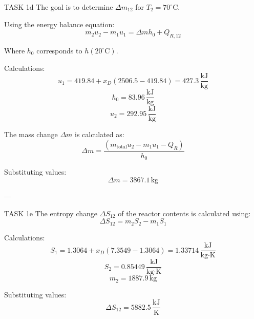 TASK 1d  
The goal is to determine \( \Delta m_{12} \) for \( T_2 = 70^\circ\text{C} \).  

Using the energy balance equation:  
\[
m_2 u_2 - m_1 u_1 = \Delta m h_0 + Q_{R,12}
\]  

Where \( h_0 \) corresponds to \( h(20^\circ\text{C}) \).  

Calculations:  
\[
u_1 = 419.84 + x_D (2506.5 - 419.84) = 427.3 \, \frac{\text{kJ}}{\text{kg}}
\]  
\[
h_0 = 83.96 \, \frac{\text{kJ}}{\text{kg}}
\]  
\[
u_2 = 292.95 \, \frac{\text{kJ}}{\text{kg}}
\]  

The mass change \( \Delta m \) is calculated as:  
\[
\Delta m = \frac{(m_{\text{total}} u_2 - m_1 u_1 - Q_R)}{h_0}
\]  

Substituting values:  
\[
\Delta m = 3867.1 \, \text{kg}
\]  

---

TASK 1e  
The entropy change \( \Delta S_{12} \) of the reactor contents is calculated using:  
\[
\Delta S_{12} = m_2 S_2 - m_1 S_1
\]  

Calculations:  
\[
S_1 = 1.3064 + x_D (7.3549 - 1.3064) = 1.33714 \, \frac{\text{kJ}}{\text{kg·K}}
\]  
\[
S_2 = 0.85449 \, \frac{\text{kJ}}{\text{kg·K}}
\]  
\[
m_2 = 1887.9 \, \text{kg}
\]  

Substituting values:  
\[
\Delta S_{12} = 5882.5 \, \frac{\text{kJ}}{\text{K}}
\]  